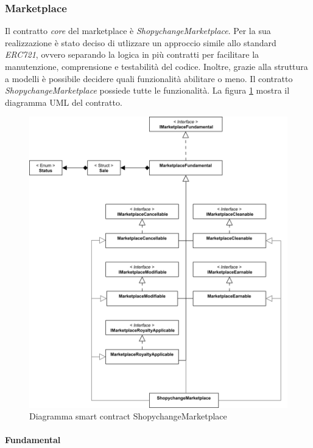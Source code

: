 \subsubsection{Marketplace}

Il contratto \textit{core} del marketplace è \textit{ShopychangeMarketplace}. Per la sua realizzazione è stato deciso di utlizzare un approccio simile allo standard \textit{ERC721}, ovvero separando la logica in più contratti per facilitare la manutenzione, comprensione e testabilità del codice. Inoltre, grazie alla struttura a modelli è possibile decidere quali funzionalità abilitare o meno. Il contratto \textit{ShopychangeMarketplace} possiede tutte le funzionalità. La figura \ref{fig:marketplaceContract} mostra il diagramma UML del contratto.

\begin{figure}[H]
    \centering
    \includegraphics[width=1\textwidth]{images/blockchainContracts/ShopychangeMarketplaceReduced.png}
    \caption{Diagramma smart contract ShopychangeMarketplace}
    \label{fig:marketplaceContract}
\end{figure}


\paragraph{Fundamental}

